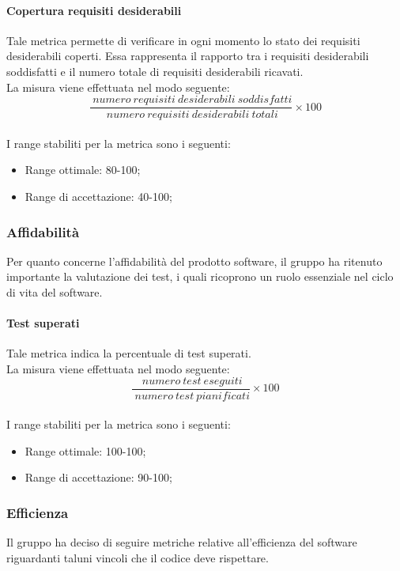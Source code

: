 			\paragraph{Copertura requisiti desiderabili}
			Tale metrica permette di verificare in ogni momento lo stato dei requisiti desiderabili coperti. Essa rappresenta il rapporto tra i requisiti desiderabili soddisfatti e il numero totale di requisiti desiderabili ricavati.
			\\La misura viene effettuata nel modo seguente:
			\begin{equation}
			\frac{~numero~requisiti~desiderabili~soddisfatti}{~numero~requisiti~desiderabili~totali}\times{100}
			\end{equation}
			\\I range stabiliti per la metrica sono i seguenti:
			\begin{itemize}
				\item Range ottimale: 80-100;
				\item Range di accettazione: 40-100;
			\end{itemize}
		\subsubsection{Affidabilità \label{S2}}
		Per quanto concerne l'affidabilità del prodotto software, il gruppo ha ritenuto importante la valutazione dei test, i quali ricoprono un ruolo essenziale nel ciclo di vita del software.
			\paragraph{Test superati}
			Tale metrica indica la percentuale di test superati.
			\\La misura viene effettuata nel modo seguente:
			\begin{equation}
				\frac{~numero~test~eseguiti}{~numero~test~pianificati}\times{100}
			\end{equation}
			\\I range stabiliti per la metrica sono i seguenti:
			\begin{itemize}
				\item Range ottimale: 100-100;
				\item Range di accettazione: 90-100;
			\end{itemize}
		\subsubsection{Efficienza \label{S3}}
		Il gruppo \hx{} ha deciso di seguire metriche relative all'efficienza del software riguardanti taluni vincoli che il codice deve rispettare.
